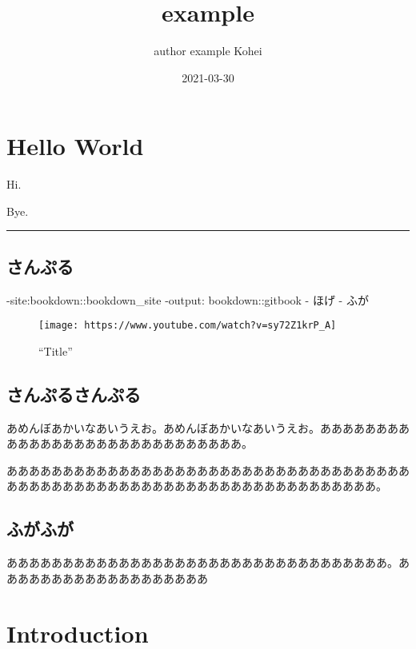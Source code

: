 \documentclass[
]{book}
\title{example}
\author{author example Kohei}
\date{2021-03-30}
\begin{document}
\frontmatter
\maketitle

\mainmatter
\hypertarget{hello-world}{%
\chapter{Hello World}\label{hello-world}}

Hi.

Bye.

\begin{center}\rule{0.5\linewidth}{0.5pt}\end{center}

\hypertarget{ux3055ux3093ux3077ux308b}{%
\section{さんぷる}\label{ux3055ux3093ux3077ux308b}}

-site:bookdown::bookdown\_site -output: bookdown::gitbook - ほげ - ふが

\begin{figure}
\centering
\texttt{[image: https://www.youtube.com/watch?v=sy72Z1krP\_A]}
\caption{``Title''}
\end{figure}

\hypertarget{ux3055ux3093ux3077ux308bux3055ux3093ux3077ux308b}{%
\section{さんぷるさんぷる}\label{ux3055ux3093ux3077ux308bux3055ux3093ux3077ux308b}}

あめんぼあかいなあいうえお。あめんぼあかいなあいうえお。あああああああああああああああああああああああああああああ。

あああああああああああああああああああああああああああああああああああああああああああああああああああああああああああああああああああああ。

\hypertarget{ux3075ux304cux3075ux304c}{%
\section{ふがふが}\label{ux3075ux304cux3075ux304c}}

ああああああああああああああああああああああああああああああああああ。あああああああああああああああああああ

\hypertarget{introduction}{%
\chapter{Introduction}\label{introduction}}
\end{document}
